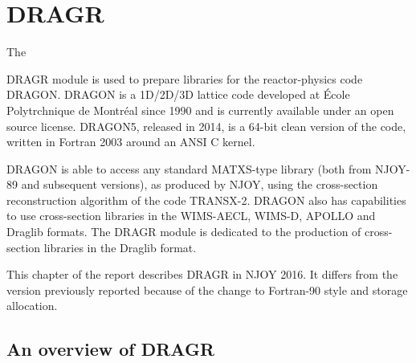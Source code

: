 \section{DRAGR}
\label{sDRAGR}

\hypertarget{sDRAGRhy}{The}
DRAGR module is used to prepare libraries for the
reactor-physics code DRAGON\cite{PIP2020,dragon}.
DRAGON is a 1D/2D/3D lattice code developed at \'Ecole Polytrchnique de
Montr\'eal since 1990 and is currently available under an open source
license. DRAGON5, released in 2014, is a 64-bit clean version of the
code, written in Fortran 2003 around an ANSI C kernel\cite{dragon5}.

DRAGON is able to access any standard MATXS-type library (both from NJOY-89
and subsequent versions), as produced by NJOY, using the cross-section
reconstruction algorithm of the code TRANSX-2\cite{TRANSX2}. DRAGON also
has capabilities to use cross-section libraries in the WIMS-AECL, WIMS-D,
APOLLO and Draglib formats. The DRAGR module is dedicated to the production
of cross-section libraries in the Draglib format.

This chapter of the report describes DRAGR in NJOY 2016.
It differs from the version previously reported
because of the change to Fortran-90 style and storage allocation.

\subsection{An overview of DRAGR}\label{sect:dragr}


